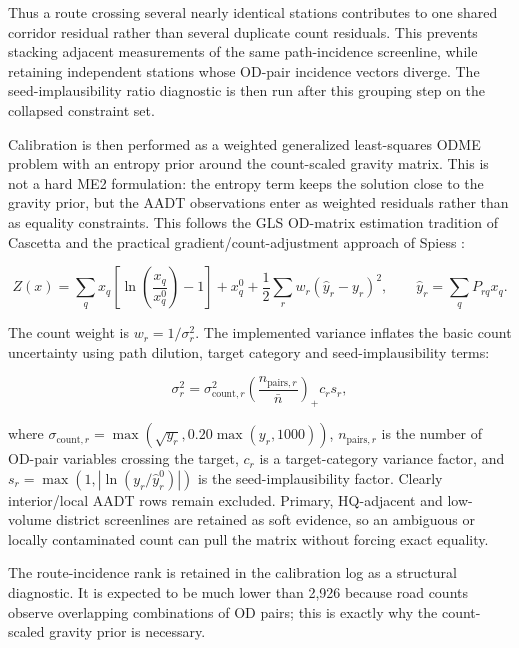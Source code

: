 \documentclass[11pt,a4paper]{article}
\begin{document}
Thus a route crossing several nearly identical stations contributes to one
shared corridor residual rather than several duplicate count residuals. This
prevents stacking adjacent measurements of the same path-incidence screenline,
while retaining independent stations whose OD-pair incidence vectors diverge.
The seed-implausibility ratio diagnostic is then run after this grouping step
on the collapsed constraint set.

Calibration is then performed as a weighted generalized least-squares ODME
problem with an entropy prior around the count-scaled gravity matrix. This is
not a hard ME2 formulation: the entropy term keeps the solution close to the
gravity prior, but the AADT observations enter as weighted residuals rather than
as equality constraints. This follows the GLS OD-matrix estimation tradition of
Cascetta \cite{cascetta1984} and the practical gradient/count-adjustment
approach of Spiess \cite{spiess1990}:

\begin{equation}
Z(x)=
\sum_q x_q\left[\ln\left(\frac{x_q}{x_q^0}\right)-1\right]+x_q^0
+\frac{1}{2}\sum_r w_r\left(\hat{y}_r-y_r\right)^2,
\qquad
\hat{y}_r=\sum_q P_{rq}x_q .
\label{eq:weighted-gls-odme}
\end{equation}

The count weight is $w_r=1/\sigma_r^2$. The implemented variance inflates the
basic count uncertainty using path dilution, target category and
seed-implausibility terms:

\begin{equation}
\sigma_r^2 =
\sigma_{\text{count},r}^2
\left(\frac{n_{\text{pairs},r}}{\bar{n}}\right)_+
c_r
s_r ,
\end{equation}

where $\sigma_{\text{count},r}=\max(\sqrt{y_r},0.20\max(y_r,1000))$,
$n_{\text{pairs},r}$ is the number of OD-pair variables crossing the target,
$c_r$ is a target-category variance factor, and
$s_r=\max(1,|\ln(y_r/\hat{y}_r^0)|)$ is the seed-implausibility factor.
Clearly interior/local AADT rows remain excluded. Primary, HQ-adjacent and
low-volume district screenlines are retained as soft evidence, so an ambiguous
or locally contaminated count can pull the matrix without forcing exact
equality.

The route-incidence rank is retained in the calibration log as a structural
diagnostic. It is expected to be much lower than 2,926 because road counts
observe overlapping combinations of OD pairs; this is exactly why the
count-scaled gravity prior is necessary.
\end{document}
